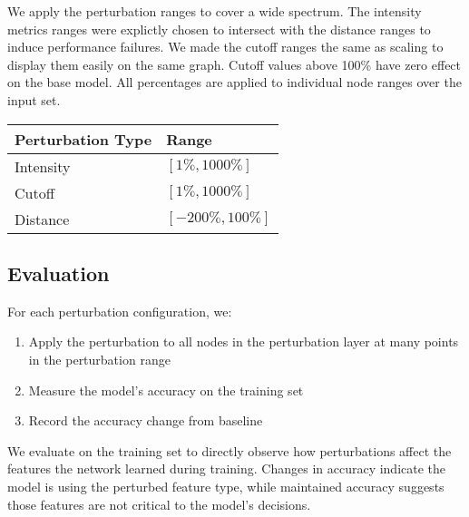 We apply the perturbation ranges to cover a wide spectrum. The intensity metrics ranges were explictly chosen to intersect with the distance ranges to induce performance failures. We made the cutoff ranges the same as scaling to display them easily on the same graph. Cutoff values above 100\% have zero effect on the base model. All percentages are applied to individual node ranges over the input set.


\begin{table}[h]
\centering
\begin{tabular}{ll}
\hline
\textbf{Perturbation Type} & \textbf{Range} \\
\hline
Intensity & $[1\%, 1000\%]$  \\
Cutoff & $[1\%, 1000\%]$  \\
Distance & $[-200\%, 100\%]$  \\
\hline
\end{tabular}
\end{table}


\subsection{Evaluation}
For each perturbation configuration, we:
\begin{enumerate}
    \item Apply the perturbation to all nodes in the perturbation layer at many points in the perturbation range
    \item Measure the model's accuracy on the training set
    \item Record the accuracy change from baseline
\end{enumerate}

We evaluate on the training set to directly observe how perturbations affect the features the network learned during training. Changes in accuracy indicate the model is using the perturbed feature type, while maintained accuracy suggests those features are not critical to the model's decisions.